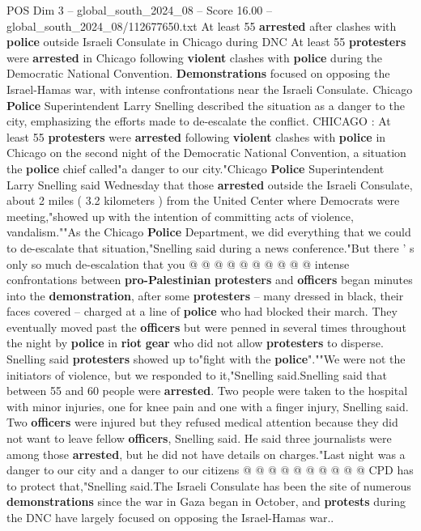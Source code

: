 \begin{textsample}{POS Dim 3 – global\_south\_2024\_08 – Score 16.00 – global\_south\_2024\_08/112677650.txt}  \label{ex:f3_pos_304}
At least 55 \textbf{arrested} after clashes with \textbf{police} outside Israeli Consulate in Chicago during DNC At least 55 \textbf{protesters} were \textbf{arrested} in Chicago following \textbf{violent} clashes with \textbf{police} during the Democratic National Convention. \textbf{Demonstrations} focused on opposing the Israel-Hamas war, with intense confrontations near the Israeli Consulate.
Chicago \textbf{Police} Superintendent Larry Snelling described the situation as a danger to the city, emphasizing the efforts made to de-escalate the conflict.
CHICAGO : At least 55 \textbf{protesters} were \textbf{arrested} following \textbf{violent} clashes with \textbf{police} in Chicago on the second night of the Democratic National Convention, a situation the \textbf{police} chief called"a danger to our city."Chicago \textbf{Police} Superintendent Larry Snelling said Wednesday that those \textbf{arrested} outside the Israeli Consulate, about 2 miles ( 3.2 kilometers ) from the United Center where Democrats were meeting,"showed up with the intention of committing acts of violence, vandalism.""As the Chicago \textbf{Police} Department, we did everything that we could to de-escalate that situation,"Snelling said during a news conference."But there ' s only so much de-escalation that you @ @ @ @ @ @ @ @ @ @ intense confrontations between \textbf{pro-Palestinian} \textbf{protesters} and \textbf{officers} began minutes into the \textbf{demonstration}, after some \textbf{protesters} -- many dressed in black, their faces covered -- charged at a line of \textbf{police} who had blocked their march.
They eventually moved past the \textbf{officers} but were penned in several times throughout the night by \textbf{police} in \textbf{riot} \textbf{gear} who did not allow \textbf{protesters} to disperse.
Snelling said \textbf{protesters} showed up to"fight with the \textbf{police}".""We were not the initiators of violence, but we responded to it,"Snelling said.Snelling said that between 55 and 60 people were \textbf{arrested}.
Two people were taken to the hospital with minor injuries, one for knee pain and one with a finger injury, Snelling said.
Two \textbf{officers} were injured but they refused medical attention because they did not want to leave fellow \textbf{officers}, Snelling said.
He said three journalists were among those \textbf{arrested}, but he did not have details on charges."Last night was a danger to our city and a danger to our citizens @ @ @ @ @ @ @ @ @ @ CPD has to protect that,"Snelling said.The Israeli Consulate has been the site of numerous \textbf{demonstrations} since the war in Gaza began in October, and \textbf{protests} during the DNC have largely focused on opposing the Israel-Hamas war..

\end{textsample}
